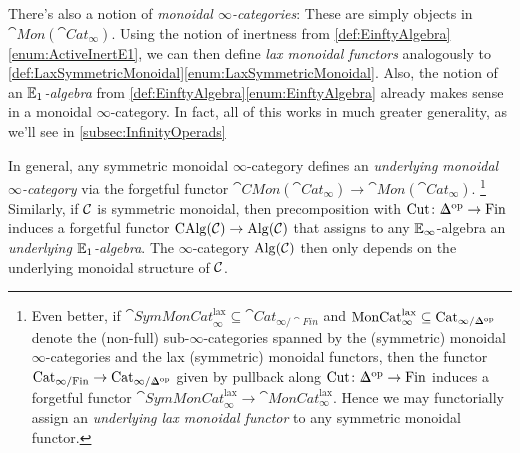 \begin{numpar}
	There's also a notion of \emph{monoidal $\infty$-categories}: These are simply objects in $\cat{Mon}(\cat{Cat}_\infty)$. Using the notion of inertness from \cref{def:EinftyAlgebra}\cref{enum:ActiveInertE1}, we can then define \emph{lax monoidal functors} analogously to \cref{def:LaxSymmetricMonoidal}\cref{enum:LaxSymmetricMonoidal}. Also, the notion of an \emph{$\mathbb{E}_1$-algebra} from \cref{def:EinftyAlgebra}\cref{enum:EinftyAlgebra} already makes sense in a monoidal $\infty$-category. In fact, all of this works in much greater generality, as we'll see in \cref{subsec:InfinityOperads}
	
	In general, any symmetric monoidal $\infty$-category defines an \emph{underlying monoidal $\infty$-category} via the forgetful functor $\cat{CMon}(\cat{Cat}_\infty)\rightarrow \cat{Mon}(\cat{Cat}_\infty)$.%
	\footnote{Even better, if $\cat{SymMonCat}_\infty^\mathrm{lax}\subseteq \cat{Cat}_{\infty/\cat{Fin}}$ and $\cat{MonCat}_\infty^\mathrm{lax}\subseteq \cat{Cat}_{\infty/\IDelta^\op}$ denote the (non-full) sub-$\infty$-categories spanned by the (symmetric) monoidal $\infty$-categories and the lax (symmetric) monoidal functors, then the functor $\cat{Cat}_{\infty/\cat{Fin}}\rightarrow \cat{Cat}_{\infty/\IDelta^\op}$ given by pullback along $\operatorname{Cut}\colon \IDelta^\op\rightarrow \cat{Fin}$ induces a forgetful functor $\cat{SymMonCat}_\infty^\mathrm{lax}\rightarrow \cat{MonCat}_\infty^\mathrm{lax}$. Hence we may functorially assign an \emph{underlying lax monoidal functor} to any symmetric monoidal functor.}
	Similarly, if $\mathcal{C}$ is symmetric monoidal, then precomposition with $\operatorname{Cut}\colon \IDelta^\op\rightarrow \cat{Fin}$ induces a forgetful functor $\mathrm{CAlg}(\mathcal{C})\rightarrow \mathrm{Alg}(\mathcal{C})$ that assigns to any $\mathbb{E}_\infty$-algebra an \emph{underlying $\mathbb{E}_1$-algebra}. The $\infty$-category $\mathrm{Alg}(\mathcal{C})$ then only depends on the underlying monoidal structure of $\mathcal{C}$. 
\end{numpar}
